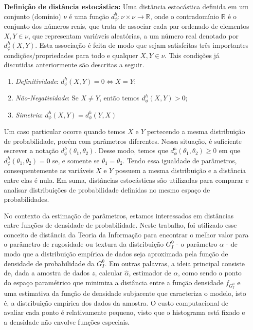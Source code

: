 \documentclass[12pt]{article}
\begin{document}
\textbf{Definição de distância estocástica:} Uma distância estocástica definida em um conjunto (domínio) $\nu$ é uma função $ d_\phi^h: \nu \times \nu \rightarrow \mathbb{R} $, onde o contradomínio $\mathbb{R}$ é o conjunto dos números reais, que trata de associar cada par ordenado de elementos $X, Y \in \nu$, que representam variáveis aleatórias, a um número real denotado por $d_\phi^h(X, Y)$. Esta associação é feita de modo que sejam satisfeitas três importantes condições/propriedades para todo e qualquer $X, Y \in \nu$. Tais condições já discutidas anteriormente são descritas a seguir.
\begin{enumerate}
    \item \textit{Definitividade}: $d_\phi^h(X, Y) = 0 \Leftrightarrow X = Y$;
    \item \textit{Não-Negatividade}: Se $X \neq Y$, então temos $d_\phi^h(X, Y) > 0$;
    \item \textit{Simetria}: $d_\phi^h(X, Y) = d_\phi^h(Y, X)$
\end{enumerate}
Um caso particular ocorre quando temos $X$ e $Y$ pertecendo a mesma distribuição de probabilidade, porém com parâmetros diferentes. Nessa situação, é suficiente escrever a notação $d_\phi^h(\theta_1, \theta_2)$. Desse modo, temos que $d_\phi^h(\theta_1, \theta_2) \geq 0$ em que $d_\phi^h(\theta_1, \theta_2) = 0$ se, e somente se $\theta_1 = \theta_2$. Tendo essa igualdade de parâmetros, consequentemente as variáveis $X$ e $Y$ possuem a mesma distribuição e a distância entre elas é nula. Em suma, distâncias estocásticas são utilizadas para comparar e analisar distribuições de probabilidade definidas no mesmo espaço de probabilidades.

No contexto da estimação de parâmetros, estamos interessados em distâncias entre funções de densidade de probabilidade. Neste trabalho, foi utilizado esse conceito de distância da Teoria da Informação para encontrar o melhor valor para o parâmetro de rugosidade ou textura da distribuição $G_I^0$ - o parâmetro $\alpha$ - de modo que a distribuição empírica de dados seja aproximada pela função de densidade de probabilidade da $G_I^0$. Em outras palavras, a ideia principal consiste de, dada a amostra de dados $z$, calcular $\widehat{\alpha}$, estimador de $\alpha$, como sendo o ponto do espaço paramétrico que minimiza a distância entre a função densidade $f_{G_I^0}$ e uma estimativa da função de densidade subjacente que caracteriza o modelo, isto é, a distribuição empírica dos dados da amostra. O custo computacional de avaliar cada ponto é relativamente pequeno, visto que o histograma está fixado e a densidade não envolve funções especiais. 
\end{document}
